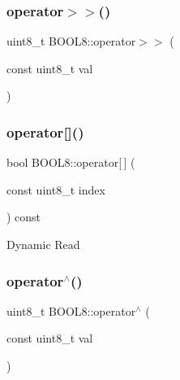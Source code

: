 \hypertarget{struct_b_o_o_l8_a85faf9252049c6e5ff85656eb8120a9b}{}\label{struct_b_o_o_l8_a85faf9252049c6e5ff85656eb8120a9b} 
\subsubsection{\texorpdfstring{operator$>$$>$()}{operator>>()}}
{\footnotesize\ttfamily uint8\+\_\+t B\+O\+O\+L8\+::operator$>$$>$ (\begin{DoxyParamCaption}\item[{const uint8\+\_\+t}]{val }\end{DoxyParamCaption})\hspace{0.3cm}{\ttfamily [inline]}}

\hypertarget{struct_b_o_o_l8_ad10cb86a21ffea65e2c307c7d39fc099}{}\label{struct_b_o_o_l8_ad10cb86a21ffea65e2c307c7d39fc099} 
\subsubsection{\texorpdfstring{operator[]()}{operator[]()}}
{\footnotesize\ttfamily bool B\+O\+O\+L8\+::operator\mbox{[}$\,$\mbox{]} (\begin{DoxyParamCaption}\item[{const uint8\+\_\+t}]{index }\end{DoxyParamCaption}) const\hspace{0.3cm}{\ttfamily [inline]}}

Dynamic Read \hypertarget{struct_b_o_o_l8_adae599000cecc5416839392676510e6d}{}\label{struct_b_o_o_l8_adae599000cecc5416839392676510e6d} 
\subsubsection{\texorpdfstring{operator$^\wedge$()}{operator^()}\hspace{0.1cm}{\footnotesize\ttfamily [1/2]}}
{\footnotesize\ttfamily uint8\+\_\+t B\+O\+O\+L8\+::operator$^\wedge$ (\begin{DoxyParamCaption}\item[{const uint8\+\_\+t}]{val }\end{DoxyParamCaption})\hspace{0.3cm}{\ttfamily [inline]}}

